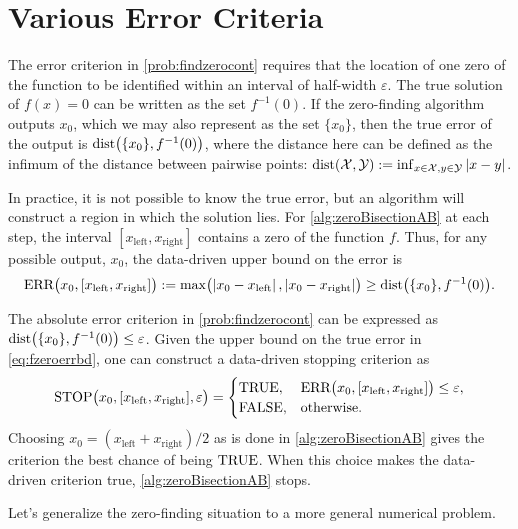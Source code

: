 \chapter{Various Error Criteria} \label{chap:relerror}
The error criterion in \cref{prob:findzerocont} requires that the location of one zero of the function to be identified within an interval of half-width $\varepsilon$.  The true solution of $f(x) = 0$ can be written as the set $f^{-1}(0)$.  If the zero-finding algorithm outputs $x_0$, which we may also represent as the set $\{x_0\}$, then the true error of the output is $\operatorname{dist}\bigl(\{x_0\},f^{-1}(0)\bigr)$, where the distance here can be defined as the infimum of the distance between pairwise points: $\operatorname{dist}(\mathcal{X},\mathcal{Y}) := \inf_{x \in \mathcal{X}, y \in \mathcal{Y}} \left \lvert x-y \right \rvert$.

In practice, it is not possible to know the true error, but an algorithm will construct a region in which the solution lies.  For \cref{alg:zeroBisectionAB} at each step, the interval $[x_{\text{left}}, x_{\text{right}}]$ contains a zero of the function $f$.  Thus, for any possible output, $x_0$, the data-driven upper bound on the error is 
\begin{equation} \label{eq:fzeroerrbd}
    \textup{ERR}\bigl(x_0,[x_{\text{left}},x_{\text{right}}]\bigr) := \max\bigl(\left \lvert x_0 - x_{\text{left}} \right \rvert ,\left \lvert x_0 - x_{\text{right}} \right \rvert \bigr) \ge \operatorname{dist}\bigl(\{x_0\},f^{-1}(0)\bigr).
\end{equation}

The absolute error criterion in \cref{prob:findzerocont} can be expressed as $\operatorname{dist}\bigl(\{x_0\},f^{-1}(0)\bigr) \le \varepsilon$.  Given the upper bound on the true error in \eqref{eq:fzeroerrbd}, one can construct a data-driven stopping criterion as
\begin{equation}
    \operatorname{STOP}\bigl(x_0,[x_{\text{left}},x_{\text{right}}],\varepsilon\bigr) = 
    \begin{cases} \textup{TRUE}, & \textup{ERR}\bigl(x_0,[x_{\text{left}},x_{\text{right}}]\bigr) \le \varepsilon,\\
    \textup{FALSE}, & \text{otherwise}.
    \end{cases}
\end{equation}
Choosing $x_0 = (x_{\text{left}}+x_{\text{right}})/2$ as is done in \cref{alg:zeroBisectionAB} gives the criterion the best chance of being $\textup{TRUE}$.  When this choice makes the data-driven criterion true, \cref{alg:zeroBisectionAB} stops.

Let's generalize the zero-finding situation to a more general numerical problem.

